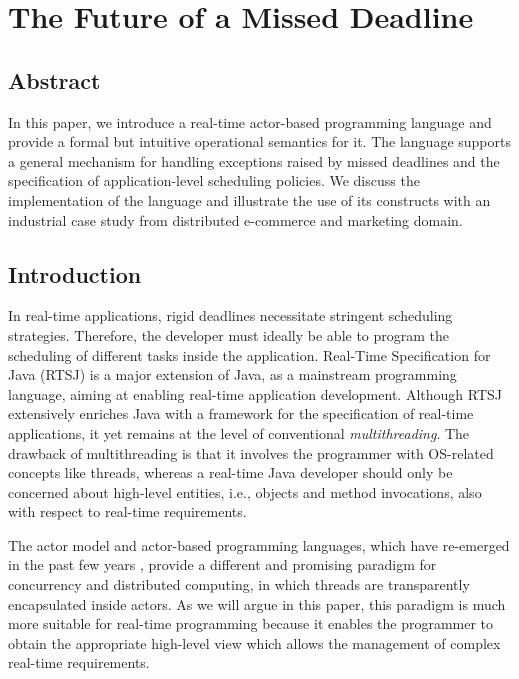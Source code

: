 
\chapter[The Future of a Missed Deadline]{The Future of a Missed Deadline}
% 
\label{ch:p01:ch02}
% 

\section*{Abstract}
In this paper, we introduce a real-time actor-based programming language
and provide a formal but intuitive  operational semantics for it. 
The language supports a general mechanism for handling exceptions raised by missed deadlines
and the specification of application-level scheduling policies.
We discuss  the implementation of the language and 
illustrate the use of its constructs with an industrial case study from distributed e-commerce and marketing domain. 


\section{Introduction} \label{sec:introduction}

In real-time applications, rigid deadlines necessitate stringent scheduling strategies.
Therefore, the developer must ideally be able to program the scheduling of different tasks inside the application.
Real-Time Specification for Java (RTSJ) \cite{jsr1,jsr282} is a major extension of Java, as a mainstream programming language, aiming at enabling real-time application development. 
Although RTSJ extensively enriches Java with a framework for 
the  specification of real-time applications, 
it yet remains at the level of conventional \textit{multithreading}.
The drawback of multithreading is that it involves the programmer with OS-related concepts like threads, whereas a real-time Java developer should only be concerned about high-level entities, i.e., objects and method invocations, also with respect to 
real-time requirements.

The actor model \cite{fnd:actor:cmpt:agha} and actor-based programming languages, which
have re-emerged in the past few years \cite{kilim:Srinivasan:Mycroft,erlang:armstrong,scala:actors:ordersky,creol:broch:owe,salsa:agha}, 
provide a different and promising paradigm for concurrency and distributed computing, in which threads are transparently encapsulated inside actors.
As we will argue in this paper, this paradigm is much more suitable for real-time programming because it enables the programmer to 
obtain the appropriate   high-level view which allows the management of   complex
real-time requirements.

